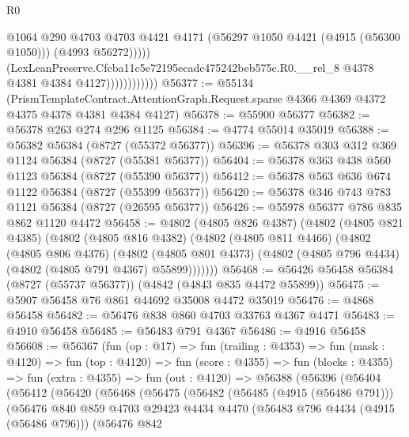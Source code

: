 \begin{lexlean}{R0}
\begin{coremodule}
                                  @1064
                                  @290
                                  @4703
                                  @4703
                                  @4421
                                  @4171
                                  (@56297 @1050 @4421 (@4915 (@56300 @1050)))
                                  (@4993 @56272)))))
                          (LexLeanPreserve.Cfcba11c5e72195ecadc475242beb575c.R0.__rel_8
                            @4378
                            @4381
                            @4384
                            @4127))))))))))))
@56377 := @55134
    (PrismTemplateContract.AttentionGraph.Request.sparse
      @4366
      @4369
      @4372
      @4375
      @4378
      @4381
      @4384
      @4127)
@56378 := @55900 @56377
@56382 := @56378 @263 @274 @296 @1125
@56384 := @4774 @55014 @35019
@56388 := @56382 @56384 (@8727 (@55372 @56377))
@56396 := @56378 @303 @312 @369 @1124 @56384 (@8727 (@55381 @56377))
@56404 := @56378 @363 @438 @560 @1123 @56384 (@8727 (@55390 @56377))
@56412 := @56378 @563 @636 @674 @1122 @56384 (@8727 (@55399 @56377))
@56420 := @56378 @346 @743 @783 @1121 @56384 (@8727 (@26595 @56377))
@56426 := @55978 @56377 @786 @835 @862 @1120 @4472
@56458 := @4802
    (@4805 @826 @4387)
    (@4802
      (@4805 @821 @4385)
      (@4802
        (@4805 @816 @4382)
        (@4802
          (@4805 @811 @4466)
          (@4802
            (@4805 @806 @4376)
            (@4802
              (@4805 @801 @4373)
              (@4802 (@4805 @796 @4434) (@4802 (@4805 @791 @4367) @55899)))))))
@56468 := @56426 @56458 @56384 (@8727 (@55737 @56377)) (@4842 (@4843 @835 @4472 @55899))
@56475 := @5907 @56458 @76 @861 @44692 @35008 @4472 @35019
@56476 := @4868 @56458
@56482 := @56476 @838 @860 @4703 @33763 @4367 @4471
@56483 := @4910 @56458
@56485 := @56483 @791 @4367
@56486 := @4916 @56458
@56608 := @56367
    (fun (op : @17) =>
    fun (trailing : @4353) =>
    fun (mask : @4120) =>
    fun (top : @4120) =>
    fun (score : @4355) =>
    fun (blocks : @4355) =>
    fun (extra : @4355) =>
    fun (out : @4120) =>
    @56388
      (@56396
        (@56404
          (@56412
            (@56420
              (@56468
                (@56475
                  (@56482
                    (@56485 (@4915 (@56486 @791)))
                    (@56476
                      @840
                      @859
                      @4703
                      @29423
                      @4434
                      @4470
                      (@56483 @796 @4434 (@4915 (@56486 @796)))
                      (@56476
                        @842

\end{coremodule}
\end{lexlean}
